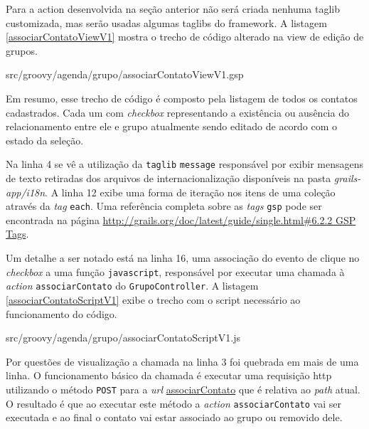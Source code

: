\documentclass[12pt]{article}
\begin{document}
    Para a action desenvolvida na seção anterior não será criada nenhuma taglib 
    customizada, mas serão usadas algumas taglibs do framework. A listagem \ref{associarContatoViewV1}
    mostra o trecho de código alterado na view de edição de grupos.
    
    
                   {src/groovy/agenda/grupo/associarContatoViewV1.gsp}
    
    Em resumo, esse trecho de código é composto pela listagem de todos os
    contatos cadastrados. Cada um com \emph{checkbox} representando a existência 
    ou ausência do relacionamento entre ele e grupo atualmente sendo editado 
    de acordo com o estado da seleção.

    Na linha 4 se vê a utilização da \texttt{taglib} \texttt{message} responsável por exibir
    mensagens de texto retiradas dos arquivos de internacionalização disponíveis 
    na pasta \emph{grails-app/i18n}. A linha 12 exibe uma forma de iteração nos 
    itens de uma coleção através da \emph{tag} \texttt{each}. Uma referência completa 
    sobre as \emph{tags} \texttt{gsp} pode ser encontrada na página \url{http://grails.org/doc/latest/guide/single.html#6.2.2 GSP Tags}. 
    
    Um detalhe a ser notado está na linha 16, uma associação do evento de clique 
    no \emph{checkbox} a uma função \texttt{javascript}, responsável por executar 
    uma chamada à \emph{action} \texttt{associarContato} do \texttt{GrupoController}.
    A listagem \ref{associarContatoScriptV1} exibe o trecho com o script necessário
    ao funcionamento do código.
    
    
                   {src/groovy/agenda/grupo/associarContatoScriptV1.js}
    
    Por questões de visualização a chamada na linha 3 foi quebrada em mais de uma linha. 
    O funcionamento básico da chamada é executar uma requisição http utilizando o método
    \texttt{POST} para a \emph{url} \url{associarContato} que é relativa ao \emph{path} 
    atual. O resultado é que ao executar este método a \emph{action} \texttt{associarContato} 
    vai ser executada e ao final o contato vai estar associado ao grupo ou removido dele.   
    
\end{document}
